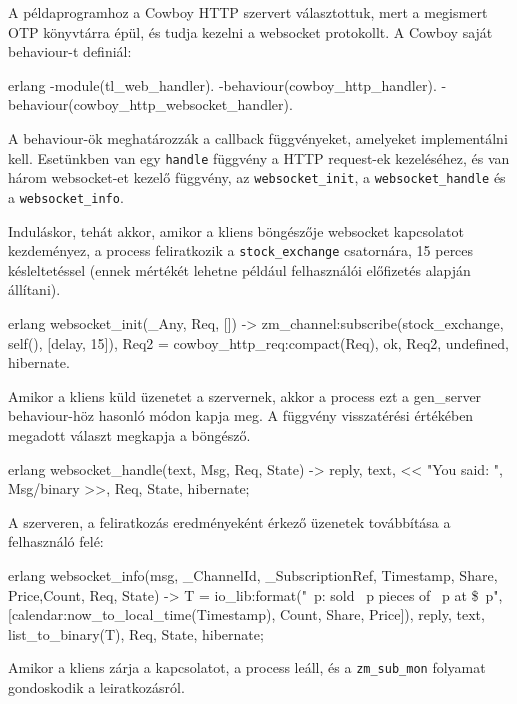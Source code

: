 \documentclass[12pt, a4paper, oneside]{book}
\begin{document}
A példaprogramhoz a Cowboy HTTP szervert választottuk, mert a megismert OTP
könyvtárra épül, és tudja kezelni a websocket protokollt. A Cowboy saját
behaviour-t definiál: 

\begin{code}{erlang}{}
-module(tl_web_handler).
-behaviour(cowboy_http_handler).
-behaviour(cowboy_http_websocket_handler).
\end{code}

A behaviour-ök meghatározzák a callback függvényeket, amelyeket implementálni
kell. Esetünkben van egy \texttt{handle} függvény a HTTP request-ek
kezeléséhez, és van három websocket-et kezelő függvény, az
\texttt{websocket\_init}, a \texttt{websocket\_handle} és a
\texttt{websocket\_info}.

Induláskor, tehát akkor, amikor a kliens böngészője websocket kapcsolatot
kezdeményez, a process feliratkozik a \texttt{stock\_exchange} csatornára, 15
perces késleltetéssel (ennek mértékét lehetne például felhasználói előfizetés
alapján állítani).

\begin{code}{erlang}{}
websocket_init(_Any, Req, []) ->
  zm_channel:subscribe(stock_exchange, self(), [{delay, 15}]),
  Req2 = cowboy_http_req:compact(Req),
  {ok, Req2, undefined, hibernate}.
\end{code}

Amikor a kliens küld üzenetet a szervernek, akkor a process ezt a gen\_server
behaviour-höz hasonló módon kapja meg. A függvény visszatérési értékében
megadott választ megkapja a böngésző.

\begin{code}{erlang}{}
websocket_handle({text, Msg}, Req, State) ->
  {reply, {text, << "You said: ", Msg/binary >>}, 
           Req, State, hibernate};
\end{code}

A szerveren, a feliratkozás eredményeként érkező üzenetek továbbítása a
felhasználó felé:

\begin{code}{erlang}{}
websocket_info({msg, {_ChannelId, _SubscriptionRef}, 
               {Timestamp, {Share, Price,Count}}}, 
                Req, State) ->
  T = io_lib:format("~p: sold ~p pieces of ~p at \$~p",
                [calendar:now_to_local_time(Timestamp), 
                Count, Share, Price]),
  {reply, {text, list_to_binary(T)}, Req, State, hibernate};
\end{code}

Amikor a kliens zárja a kapcsolatot, a process leáll, és a
\texttt{zm\_sub\_mon} folyamat gondoskodik a leiratkozásról.
\end{document}
